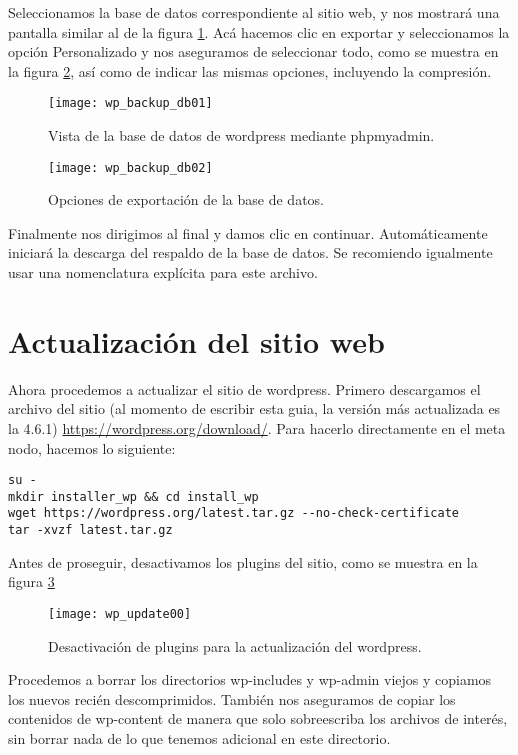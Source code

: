 Seleccionamos la base  de datos correspondiente al sitio web, y nos mostrará una pantalla similar al de la figura \ref{fig:wp_backup_db01}. Acá hacemos clic en exportar
y seleccionamos la opción Personalizado y nos aseguramos de seleccionar todo, como se muestra en la figura \ref{fig:wp_backup_db02}, así como de indicar las mismas opciones, incluyendo la compresión.

\begin{figure}[H]
\centering
\texttt{[image: wp\_backup\_db01]}
\caption{Vista de la base de datos de wordpress mediante phpmyadmin.}
\label{fig:wp_backup_db01}
\end{figure}

\begin{figure}[H]
\centering
\texttt{[image: wp\_backup\_db02]}
\caption{Opciones de exportación de la base de datos.}
\label{fig:wp_backup_db02}
\end{figure}

Finalmente nos dirigimos al final y damos clic en continuar. Automáticamente iniciará la descarga del respaldo de la base de datos. Se recomiendo igualmente usar una nomenclatura explícita para este archivo.

\section{Actualización del sitio web}
Ahora procedemos a actualizar el sitio de wordpress. Primero descargamos el archivo del sitio (al momento de escribir esta guia, la versión más actualizada es la 4.6.1) \url{https://wordpress.org/download/}. Para hacerlo directamente en el meta nodo,  hacemos lo siguiente:

\begin{lstlisting}
su -
mkdir installer_wp && cd install_wp
wget https://wordpress.org/latest.tar.gz --no-check-certificate
tar -xvzf latest.tar.gz 
\end{lstlisting}

Antes de proseguir, desactivamos los plugins del sitio, como se muestra en la figura \ref{fig:wp_update00}

\begin{figure}[H]
\centering
\texttt{[image: wp\_update00]}
\caption{Desactivación de plugins para la actualización del wordpress.}
\label{fig:wp_update00}
\end{figure}

Procedemos a borrar los directorios wp-includes y wp-admin viejos y copiamos los nuevos recién descomprimidos. También nos aseguramos de copiar los contenidos de wp-content de manera que solo sobreescriba los archivos de interés, sin borrar nada de lo que tenemos adicional en este directorio.

